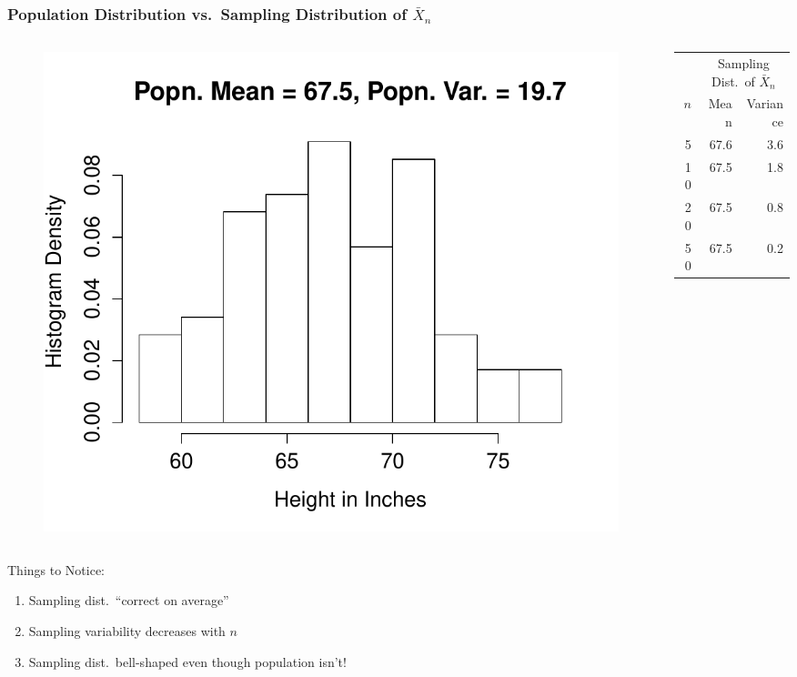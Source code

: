 \documentclass[handout]{beamer}
\begin{document}
\begin{frame}
\frametitle{Population Distribution vs.\ Sampling Distribution of $\bar{X}_n$}

\begin{columns} 
\begin{column}[c]{6cm} 

\begin{figure}
\centering
\includegraphics[scale = 0.35]{./images/height_hist}
\end{figure}
\end{column} 
\begin{column}[c]{6cm} 

 \small
\begin{table}
\begin{tabular}{|rrr|}
\hline
&\multicolumn{2}{c|}{Sampling Dist.\ of $\bar{X}_n$}\\
$n$&Mean&Variance\\
\hline
5&67.6&3.6\\
10&67.5&1.8\\
20&67.5&0.8\\
50&67.5&0.2\\
\hline
\end{tabular}
\end{table}

\end{column} 
\end{columns} 
\begin{alertblock}{Things to Notice:}
\begin{enumerate}
	\item Sampling dist.\ ``correct on average'' 
	\item Sampling variability decreases with $n$
  \item Sampling dist.\ bell-shaped even though population isn't!
\end{enumerate}
\end{alertblock}
\end{frame}
\end{document}
